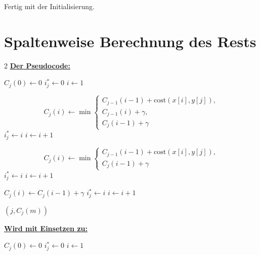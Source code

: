 Fertig mit der Initialisierung.

\newpage
\section*{Spaltenweise Berechnung des Rests}


\begin{multicols}{2}
    \noindent \textbf{\underline{Der Pseudocode:}}
    \begin{algorithmic}
            \State $C_j(0) \gets 0$
            \State $i_j^\ast \gets 0$
            \State $i \gets 1$

                \State
                \[
                    C_j(i)\gets
                    \min\left\{
                            \begin{array}{l}
                                C_{j-1}(i-1)+\mathrm{cost}(x[i],y[j]),\\
                                C_{j-1}(i)+\gamma,\\
                                C_j(i-1)+\gamma
                            \end{array}
                    \right.
                \]
                    \State $i_j^\ast \gets i$
                \EndIf
                \State $i \gets i+1$
            \EndWhile

                \State
                \[
                    C_j(i)\gets
                    \min\left\{
                            \begin{array}{l}
                                C_{j-1}(i-1)+\mathrm{cost}(x[i],y[j]),\\
                                C_j(i-1)+\gamma
                            \end{array}
                    \right.
                \]
                    \State $i_j^\ast \gets i$
                \EndIf
                \State $i \gets i+1$

                    \State $C_j(i)\gets C_j(i-1)+\gamma$
                        \State $i_j^\ast \gets i$
                    \EndIf
                    \State $i \gets i+1$
                \EndWhile
            \EndIf

                \State \Return $(j,C_j(m))$
            \EndIf
        \EndFor
    \end{algorithmic}
    \columnbreak
    \textbf{\underline{Wird mit Einsetzen zu:}}
    \begin{algorithmic}
            \State $C_j(0) \gets 0$
            \State $i_j^\ast \gets 0$
            \State $i \gets 1$


\end{algorithmic}
\end{multicols}
